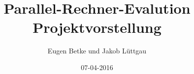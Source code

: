 \documentclass[table,compress]{beamer}
\title{Parallel-Rechner-Evalution\\Projektvorstellung}
\author{Eugen Betke und Jakob Lüttgau}
\institute{Forschungsgruppe\\Deutsches Klimarechnenzentrum}
\date{07-04-2016}
\begin{document}
\begin{frame}
      \titlepage
\end{frame}

\begin{frame}
      \tableofcontents
\end{frame}

\end{document}
